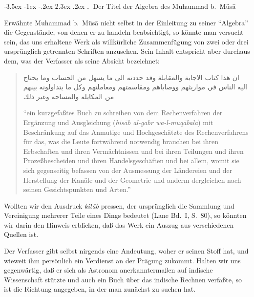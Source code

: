 \documentclass[11pt,a4paper]{article}
\makeatletter
\newcommand{\RL}[1]{\beginR#1\endR}
\renewcommand{\section}{\@startsection{section}{1}{\z@}%
  {-3.5ex \@plus -1ex \@minus -.2ex}%
  {2.3ex \@plus .2ex}%
  {\normalfont\Large\bfseries\color{sectioncolor}\thesection.\ }}
\newcommand{\ar}[1]{{\arabicfont\RL{#1}}}
\newcommand{\enquote}[1]{``#1''}
\makeatother
\begin{document}
\clearpage

\section{Der Titel der Algebra des Muhammad b.\ M\"us\=a}

Erw\"ahnte Muhammad b.\ M\"us\=a nicht selbst in der Einleitung zu seiner \enquote{Algebra} die Gegenst\"ande, von denen er zu handeln beabsichtigt, so k\"onnte man versucht sein, das uns erhaltene Werk als willk\"urliche Zusammenf\"ugung von zwei oder drei urspr\"unglich getrennten Schriften anzusehen. Sein Inhalt entspricht aber durchaus dem, was der Verfasser als seine Absicht bezeichnet:

\begin{quote}
\ar{ان هذا كتاب الاجابة والمقابلة وقد حددته الى ما يسهل من الحساب وما يحتاج اليه الناس في مواريثهم ووصاياهم ومقاسمتهم ومعاملتهم وكل ما يتداولونه بينهم من المكايلة والمساحة وغير ذلك}

\enquote{ein kurzgefa\ss{}tes Buch zu schreiben von dem Rechenverfahren der Erg\"anzung und Ausgleichung (\textit{his\=ab al-gabr wa-l-muq\=abala}) mit Beschr\"ankung auf das Anmutige und Hochgesch\"atzte des Rechenverfahrens f\"ur das, was die Leute fortw\"ahrend notwendig brauchen bei ihren Erbschaften und ihren Verm\"achtnissen und bei ihren Teilungen und ihren Proze\ss{}bescheiden und ihren Handelsgesch\"aften und bei allem, womit sie sich gegenseitig befassen von der Ausmessung der L\"andereien und der Herstellung der Kan\"ale und der Geometrie und anderm dergleichen nach seinen Gesichtspunkten und Arten.}
\end{quote}

Wollten wir den Ausdruck \textit{kit\=ab} pressen, der urspr\"unglich die Sammlung und Vereinigung mehrerer Teile eines Dings bedeutet (Lane Bd.\ I, S.\ 80), so k\"onnten wir darin den Hinweis erblicken, da\ss{} das Werk ein Auszug aus verschiedenen Quellen ist.

Der Verfasser gibt selbst nirgends eine Andeutung, woher er seinen Stoff hat, und wieweit ihm pers\"onlich ein Verdienst an der Pr\"agung zukommt. Halten wir uns gegenw\"artig, da\ss{} er sich als Astronom anerkannterma\ss{}en auf indische Wissenschaft st\"utzte und auch ein Buch \"uber das indische Rechnen verfa\ss{}te, so ist die Richtung angegeben, in der man zun\"achst zu suchen hat.
\end{document}
